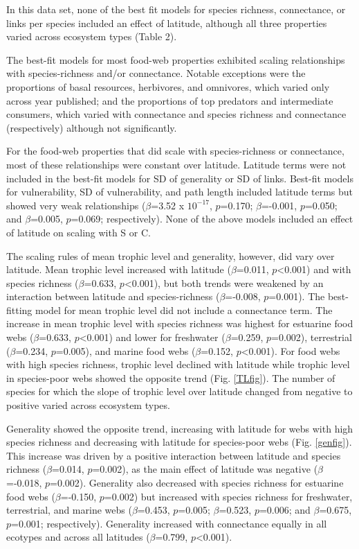 \documentclass[12pt]{article}
\begin{document}
In this data set, none of the best fit models for species richness, connectance, or links per species included an 
effect of latitude, although all three properties varied across ecosystem types (Table 2). 


The best-fit models for most food-web properties exhibited scaling relationships with species-richness and/or 
connectance. Notable exceptions were the proportions of basal resources, herbivores, and omnivores, which varied only 
across year published; and the proportions of top predators and intermediate consumers, which varied with connectance 
and species richness and connectance (respectively) although not significantly.


For the food-web properties that did scale with species-richness or connectance, most of these relationships were 
constant over latitude. Latitude terms were not included in the best-fit models for SD of generality or 
SD of links. Best-fit models for vulnerability, SD of vulnerability, and path length included latitude terms but showed 
very weak relationships ($\beta$=3.52 x $10^{-17}$, $p$=0.170; $\beta$=-0.001, $p$=0.050; and $\beta$=0.005, $p$=0.069; 
respectively). None of the above models included an effect of latitude on scaling with S or C.


The scaling rules of mean trophic level and generality, however, did vary over latitude. 
Mean trophic level increased with latitude ($\beta$=0.011, $p$<0.001) and with species richness 
($\beta$=0.633, $p$<0.001), but both trends were weakened by an interaction between latitude and species-richness 
($\beta$=-0.008, $p$=0.001). The best-fitting model for mean trophic 
level did not include a connectance term. The increase in mean trophic level with species richness was highest for 
estuarine food webs ($\beta$=0.633, $p$<0.001) and lower for freshwater ($\beta$=0.259, $p$=0.002), terrestrial 
($\beta$=0.234, $p$=0.005), and marine food webs ($\beta$=0.152, $p$<0.001). For food webs with high species richness, 
trophic level declined with latitude while trophic level in species-poor webs showed the opposite trend 
(Fig. \ref{TLfig}). The number of species for which the slope of trophic level over latitude changed from negative to 
positive varied across ecosystem types.


Generality showed the opposite trend, increasing with latitude for webs with high species richness and decreasing with
latitude for species-poor webs (Fig. \ref{genfig}).
This increase was driven by a positive interaction between latitude and species richness ($\beta$=0.014, $p$=0.002), as 
the main effect of latitude was negative ($\beta$=-0.018, $p$=0.002). Generality also decreased with species richness 
for estuarine food webs ($\beta$=-0.150, $p$=0.002) but increased with species richness for freshwater, terrestrial, 
and marine webs ($\beta$=0.453, $p$=0.005; $\beta$=0.523, $p$=0.006; and $\beta$=0.675, $p$=0.001; respectively). 
Generality increased with connectance equally in all ecotypes and across all latitudes ($\beta$=0.799, $p$<0.001).
\end{document}
